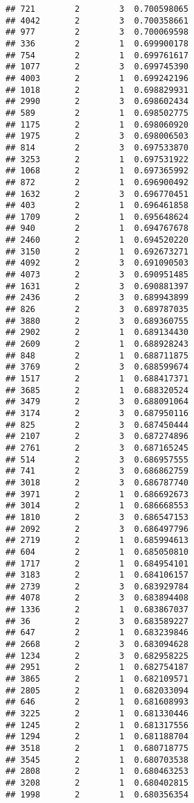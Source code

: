 \documentclass[
]{article}
\begin{document}
\begin{verbatim}
## 721        2        3  0.700598065
## 4042       2        3  0.700358661
## 977        2        3  0.700069598
## 336        2        1  0.699900178
## 754        2        1  0.699761617
## 1077       2        3  0.699745390
## 4003       2        1  0.699242196
## 1018       2        1  0.698829931
## 2990       2        3  0.698602434
## 589        2        1  0.698502775
## 1175       2        1  0.698060920
## 1975       2        3  0.698006503
## 814        2        3  0.697533870
## 3253       2        1  0.697531922
## 1068       2        1  0.697365992
## 872        2        1  0.696900492
## 1632       2        3  0.696770451
## 403        2        1  0.696461858
## 1709       2        1  0.695648624
## 940        2        1  0.694767678
## 2460       2        1  0.694520220
## 3150       2        1  0.692673271
## 4092       2        3  0.691090503
## 4073       2        3  0.690951485
## 1631       2        3  0.690881397
## 2436       2        3  0.689943899
## 826        2        3  0.689787035
## 3880       2        3  0.689360755
## 2902       2        1  0.689134430
## 2609       2        1  0.688928243
## 848        2        1  0.688711875
## 3769       2        3  0.688599674
## 1517       2        1  0.688417371
## 3685       2        1  0.688320524
## 3479       2        3  0.688091064
## 3174       2        3  0.687950116
## 825        2        3  0.687450444
## 2107       2        3  0.687274896
## 2761       2        3  0.687165245
## 514        2        3  0.686957555
## 741        2        3  0.686862759
## 3018       2        3  0.686787740
## 3971       2        1  0.686692673
## 3014       2        1  0.686668553
## 1810       2        3  0.686547153
## 2092       2        3  0.686497796
## 2719       2        1  0.685994613
## 604        2        1  0.685050810
## 1717       2        1  0.684954101
## 3183       2        1  0.684106157
## 2739       2        3  0.683929784
## 4078       2        3  0.683894408
## 1336       2        1  0.683867037
## 36         2        3  0.683589227
## 647        2        1  0.683239846
## 2668       2        3  0.683094628
## 1234       2        3  0.682958225
## 2951       2        1  0.682754187
## 3865       2        1  0.682109571
## 2805       2        1  0.682033094
## 646        2        1  0.681608993
## 3225       2        1  0.681330446
## 1245       2        1  0.681317556
## 1294       2        1  0.681188704
## 3518       2        1  0.680718775
## 3545       2        1  0.680703538
## 2808       2        1  0.680463253
## 3208       2        1  0.680402815
## 1998       2        1  0.680356354

\end{verbatim}
\end{document}
